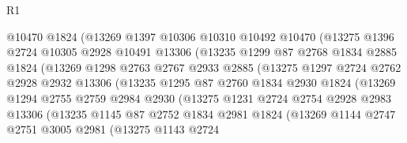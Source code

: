 \begin{lexlean}{R1}
\begin{coremodule}
                    @10470
                    @1824
                    (@13269
                      @1397
                      @10306
                      @10310
                      @10492
                      @10470
                      (@13275
                        @1396
                        @2724
                        @10305
                        @2928
                        @10491
                        @13306
                        (@13235
                          @1299
                          @87
                          @2768
                          @1834
                          @2885
                          @1824
                          (@13269
                            @1298
                            @2763
                            @2767
                            @2933
                            @2885
                            (@13275
                              @1297
                              @2724
                              @2762
                              @2928
                              @2932
                              @13306
                              (@13235
                                @1295
                                @87
                                @2760
                                @1834
                                @2930
                                @1824
                                (@13269
                                  @1294
                                  @2755
                                  @2759
                                  @2984
                                  @2930
                                  (@13275
                                    @1231
                                    @2724
                                    @2754
                                    @2928
                                    @2983
                                    @13306
                                    (@13235
                                      @1145
                                      @87
                                      @2752
                                      @1834
                                      @2981
                                      @1824
                                      (@13269
                                        @1144
                                        @2747
                                        @2751
                                        @3005
                                        @2981
                                        (@13275
                                          @1143
                                          @2724

\end{coremodule}
\end{lexlean}
